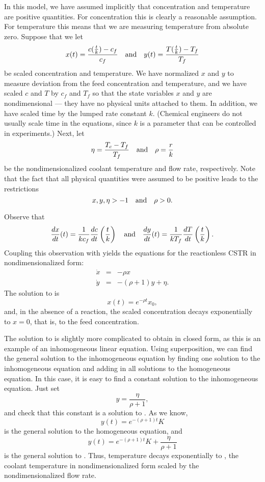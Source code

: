 In this model, we have assumed implicitly that concentration and
temperature are positive quantities.  For concentration this is
clearly a reasonable assumption.  For temperature this means
that we are measuring temperature from absolute zero.  Suppose
that we let  
\[
x(t) = \frac{c(\frac{t}{k})-c_f}{c_f} \quad\mbox{and}\quad 
y(t) = \frac{T(\frac{t}{k})-T_f}{T_f}
\]
be scaled concentration and temperature.  We have normalized $x$
and $y$ to measure deviation from the feed concentration and
temperature, and we have scaled $c$ and $T$ by $c_f$ and $T_f$
so that the state variables $x$ and $y$ are nondimensional ---
they have no physical units attached to them.  In addition, we
have scaled time by the lumped rate constant $k$.  (Chemical engineers
do not usually scale time in the equations, since $k$ is a 
parameter that can be controlled in experiments.) Next, let 
\[
\eta = \frac{T_c-T_f}{T_f} \quad\mbox{and}\quad \rho = \frac{r}{k}
\]
be the nondimensionalized coolant temperature and flow rate,
respectively.  Note that the fact that all physical quantities
were assumed to be positive leads to the restrictions
\[
x, y,\eta >-1  \quad\mbox{and}\quad \rho>0.
\]

Observe that 
\[
\frac{dx}{dt}(t)=\frac{1}{kc_f}\frac{dc}{dt}\left(\frac{t}{k}\right) \quad\mbox{and}\quad
\frac{dy}{dt}(t)=\frac{1}{kT_f}\frac{dT}{dt}\left(\frac{t}{k}\right).
\]
Coupling this observation with  yields the equations 
for the reactionless CSTR in nondimensionalized form:
\begin{eqnarray}
\dot{x} & = & -\rho x \label{e:ndCSTRlina} \\
\dot{y} & = & -(\rho+1)y + \eta. \label{e:ndCSTRlinb}
\end{eqnarray}
The solution to  is 
\[
x(t) = e^{-\rho t}x_0,
\]
and, in the absence of a reaction, the scaled concentration
decays exponentially to $x=0$, that is, to the feed
concentration.

The solution to  is slightly more complicated
to obtain in closed form, as this is an example of an
inhomogeneous linear equation.  Using 
superposition, we can find
the general solution to the inhomogeneous equation by finding
one solution to the inhomogeneous 
equation and adding in all
solutions to the homogeneous equation.  
In this case, it is easy to find a constant solution to the 
inhomogeneous equation.  Just set
\begin{equation}  \label{e:basetemp}
y = \frac{\eta}{\rho+1},
\end{equation}
and check that this constant is a solution to
.  As we know,
\[
y(t) = e^{-(\rho+1)t}K
\]
is the general solution to the homogeneous equation, and
\[
y(t) = e^{-(\rho+1)t}K + \frac{\eta}{\rho+1}
\]
is the general solution to .  Thus,
temperature decays exponentially to , the
coolant temperature in nondimensionalized form scaled by the
nondimensionalized flow rate.

